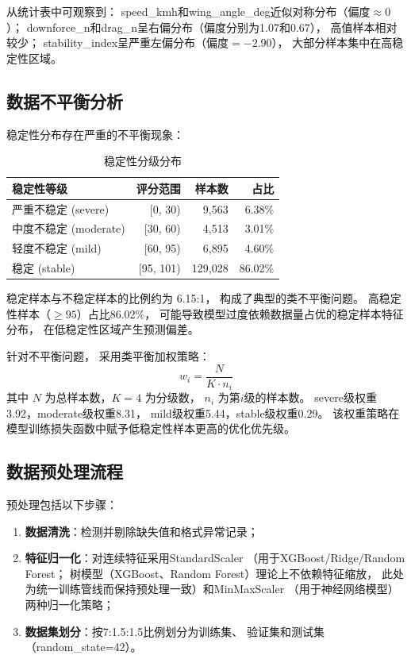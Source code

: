 从统计表中可观察到：
speed\_kmh和wing\_angle\_deg近似对称分布（偏度$\approx 0$）；
downforce\_n和drag\_n呈右偏分布（偏度分别为1.07和0.67），
高值样本相对较少；
stability\_index呈严重左偏分布（偏度$=-2.90$），
大部分样本集中在高稳定性区域。

\subsection{数据不平衡分析}

稳定性分布存在严重的不平衡现象：

\begin{table}[H]
\centering
\caption{稳定性分级分布}
\begin{tabular}{lrrr}
\toprule
稳定性等级 & 评分范围 & 样本数 & 占比 \\
\midrule
严重不稳定 (severe) & [0, 30) & 9,563 & 6.38\% \\
中度不稳定 (moderate) & [30, 60) & 4,513 & 3.01\% \\
轻度不稳定 (mild) & [60, 95) & 6,895 & 4.60\% \\
稳定 (stable) & [95, 101) & 129,028 & 86.02\% \\
\bottomrule
\end{tabular}
\end{table}

稳定样本与不稳定样本的比例约为 6.15:1，
构成了典型的类不平衡问题。
高稳定性样本（$\geq 95$）占比86.02\%，
可能导致模型过度依赖数据量占优的稳定样本特征分布，
在低稳定性区域产生预测偏差。

针对不平衡问题，
采用类平衡加权策略：
\begin{equation}
    w_i = \frac{N}{K \cdot n_i}
\end{equation}
其中 $N$ 为总样本数，$K=4$ 为分级数，
$n_i$ 为第$i$级的样本数。
severe级权重3.92，moderate级权重8.31，
mild级权重5.44，stable级权重0.29。
该权重策略在模型训练损失函数中赋予低稳定性样本更高的优化优先级。

\subsection{数据预处理流程}

预处理包括以下步骤：
\begin{enumerate}
    \item \textbf{数据清洗}：检测并剔除缺失值和格式异常记录；
    \item \textbf{特征归一化}：对连续特征采用StandardScaler
        （用于XGBoost/Ridge/Random Forest；
        树模型（XGBoost、Random Forest）理论上不依赖特征缩放，
        此处为统一训练管线而保持预处理一致）和MinMaxScaler
        （用于神经网络模型）两种归一化策略；
    \item \textbf{数据集划分}：按7:1.5:1.5比例划分为训练集、
        验证集和测试集（random\_state=42）。
\end{enumerate}

